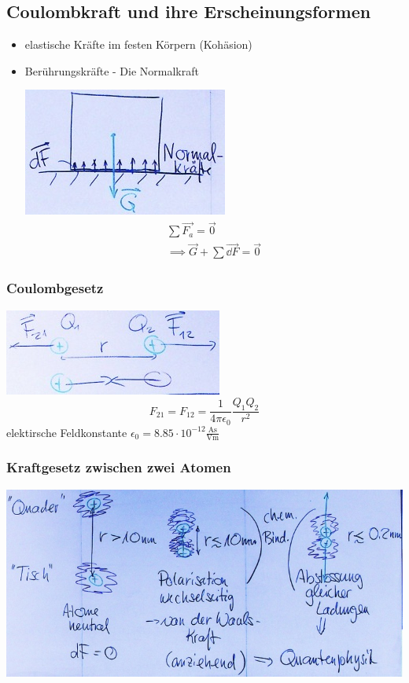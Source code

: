 \subsection{Coulombkraft und ihre Erscheinungsformen}
\begin{itemize}
	\item elastische Kräfte im festen Körpern (Kohäsion)
	\item Berührungskräfte - Die Normalkraft
		\begin{bsp*}[ note = Quader auf Tisch in Ruhe ]
			\includegraphics{Bild24}
			\begin{gather*}
				\sum \vec{F_a} = \vec{0} \\
				\implies \vec{G} + \sum \vec{\dd F} = \vec{0}
			\end{gather*}
		\end{bsp*}
\end{itemize}

\subsubsection{Coulombgesetz}
\includegraphics{Bild25}
\[ F_{21} = F_{12} = \frac{1}{4 \pi \epsilon_0} \frac{Q_1 Q_2}{r^2} \]
elektirsche Feldkonstante $\epsilon_0 = 8.85 \cdot 10^{-12} \frac{\text{As}}{\text{Vm}}$

\subsubsection{Kraftgesetz zwischen zwei Atomen}
\includegraphics{Bild26}

